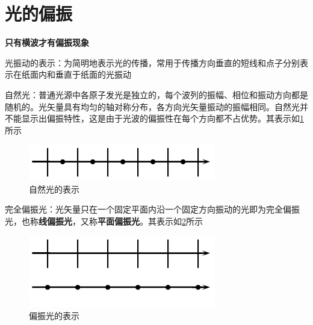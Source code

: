 \documentclass[12pt, a4paper, twoside]{ctexbook}
\begin{document}
\section{光的偏振}
\textbf{只有横波才有偏振现象}

{\sonti 光振动的表示}：为简明地表示光的传播，常用于传播方向垂直的短线和点子分别表示在纸面内和垂直于纸面的光振动

{\sonti 自然光}：普通光源中各原子发光是独立的，每个波列的振幅、相位和振动方向都是随机的。光矢量具有均匀的轴对称分布，各方向光矢量振动的振幅相同。自然光并不能显示出偏振特性，这是由于光波的偏振性在每个方向都不占优势。其表示如\textcolor{blue}{\cref{fig:自然光}}所示
\begin{figure}[H]
    \centerline{\includegraphics[scale=1.2]{自然光}}
    \caption{自然光的表示}
    \label{fig:自然光}
\end{figure}

{\sonti 完全偏振光}：光矢量只在一个固定平面内沿一个固定方向振动的光即为完全偏振光，也称\textbf{线偏振光}，又称\textbf{平面偏振光}。其表示如\textcolor{blue}{\cref{fig:偏振光}}所示
\begin{figure}[H]
    \centerline{\includegraphics[scale=1.2]{偏振光}}
    \caption{偏振光的表示}
    \label{fig:偏振光}
\end{figure}
\end{document}
